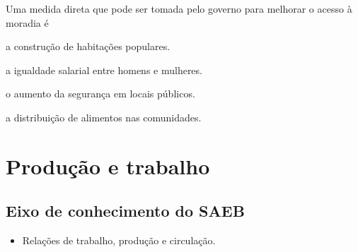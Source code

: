 \noindent{}Uma medida direta que pode ser tomada pelo governo para melhorar o
acesso à moradia é

\begin{escolha}
\item a construção de habitações populares.

\item a igualdade salarial entre homens e mulheres.

\item o aumento da segurança em locais públicos.

\item a distribuição de alimentos nas comunidades.
\end{escolha}


\chapter{Produção e trabalho}


\section{Eixo de conhecimento do SAEB}

\begin{itemize}
\item Relações de trabalho, produção e circulação.
\end{itemize}


